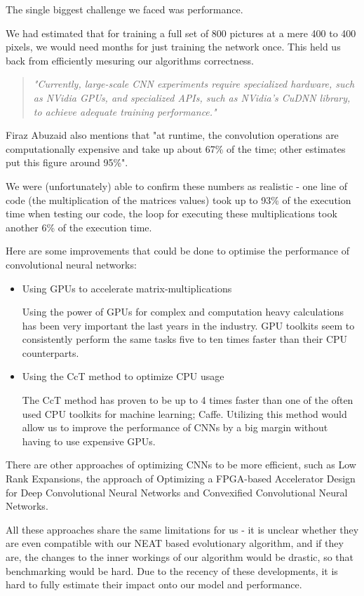 The single biggest challenge we faced was performance.

We had estimated that for training a full set of 800 pictures at a mere 400 to 400 pixels, we would need months for just training the network once. This held us back from efficiently mesuring our algorithms correctness.

\begin{quote}
	\emph{"Currently, large-scale CNN experiments require specialized hardware, such as NVidia GPUs,
		and specialized APIs, such as NVidia’s CuDNN library, to
		achieve  adequate  training  performance."} \cite{Abuzaid2015} 
\end{quote}

Firaz Abuzaid also mentions that "at runtime,  the convolution operations are computationally expensive and take up about 67\% of the time; other estimates put this figure around 95\%".

We were (unfortunately) able to confirm these numbers as realistic - one line of code (the multiplication of the matrices values) took up to 93\% of the execution time when testing our code, the loop for executing these multiplications took another 6\% of the execution time. 

Here are some improvements that could be done to optimise the performance of convolutional neural networks:

\begin{itemize}
	\item Using GPUs to accelerate matrix-multiplications\cite{Hochberg2012}
	
	Using the power of GPUs for complex and computation heavy calculations has been very important the last years in the industry. GPU toolkits seem to consistently perform the same tasks five to ten times faster than their CPU counterparts.\cite{Abuzaid2015}
	
	\item Using the CcT method to optimize CPU usage
	
	The CcT method has proven to be up to 4 times faster than one of the often used CPU toolkits for machine learning; Caffe. Utilizing this method would allow us to improve the performance of CNNs by a big margin without having to use expensive GPUs.\cite{Abuzaid2015}
\end{itemize}

There are other approaches of optimizing CNNs to be more efficient, such as Low Rank Expansions\cite{Jaderberg2014},  the approach of Optimizing a FPGA-based Accelerator Design for Deep Convolutional Neural Networks\cite{Zhang2015} and Convexified Convolutional Neural Networks\cite{Zhang2016}.

All these approaches share the same limitations for us - it is unclear whether they are even compatible with our NEAT based evolutionary algorithm, and if they are, the changes to the inner workings of our algorithm would be drastic, so that benchmarking would be hard. Due to the recency of these developments, it is hard to fully estimate their impact onto our model and performance.
